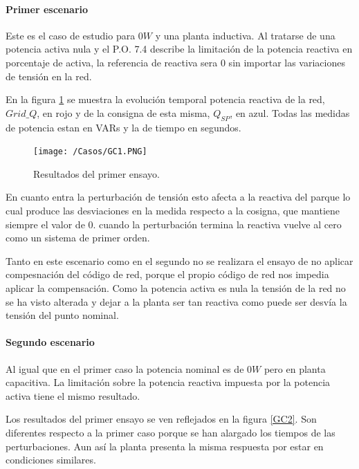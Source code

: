 \documentclass{book}
\begin{document}
	\paragraph{Primer escenario} 

Este es el caso de estudio para $0W$ y una planta inductiva. Al tratarse de una potencia activa nula y el P.O. 7.4 describe la limitaci\'on de la potencia reactiva en porcentaje de activa, la referencia de reactiva sera 0 sin importar las variaciones de tensi\'on en la red. \par

En la figura \ref{GC1} se muestra la evoluci\'on temporal potencia reactiva de la red, $Grid\_Q$, en rojo y de la consigna de esta misma, $Q_{SP}$, en azul. Todas las medidas de potencia estan en VARs y la de tiempo en segundos.\par

\begin{figure}[h!]
\centering
\texttt{[image: /Casos/GC1.PNG]}
\caption{Resultados del primer ensayo. }
\label{GC1}
\end{figure} \par

En cuanto entra la perturbaci\'on de tensi\'on esto afecta a la reactiva del parque lo cual produce las desviaciones en la medida respecto a la cosigna, que mantiene siempre el valor de 0. cuando la perturbaci\'on termina la reactiva vuelve al cero como un sistema de primer orden. \par 

Tanto en este escenario como en el segundo no se realizara el ensayo de no aplicar compesnaci\'on del c\'odigo de red, porque el propio c\'odigo de red nos impedia aplicar la compensaci\'on. Como la potencia activa es nula la tensi\'on de la red no se ha visto alterada y dejar a la planta ser tan reactiva como puede ser desv\'ia la tensi\'on del punto nominal. \par


	\paragraph{Segundo escenario}

Al igual que en el primer caso la potencia nominal es de $0W$ pero en planta capacitiva. La limitaci\'on sobre la potencia reactiva impuesta por la potencia activa tiene el mismo resultado. \par

Los resultados del primer ensayo se ven reflejados en la figura \ref{GC2}. Son diferentes respecto a la primer caso porque se han alargado los tiempos de las perturbaciones. Aun as\'i la planta presenta la misma respuesta por estar en condiciones similares. \par
\end{document}
